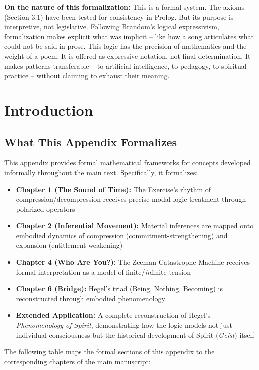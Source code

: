 \documentclass[12pt]{book}
\begin{document}
\textbf{On the nature of this formalization:} This is a formal system. The axioms (Section 3.1) have been tested for consistency in Prolog. But its purpose is interpretive, not legislative. Following Brandom's logical expressivism, formalization makes explicit what was implicit -- like how a song articulates what could not be said in prose. This logic has the precision of mathematics and the weight of a poem. It is offered as expressive notation, not final determination. It makes patterns transferable -- to artificial intelligence, to pedagogy, to spiritual practice -- without claiming to exhaust their meaning.

\section{Introduction}

\subsection{What This Appendix Formalizes}

This appendix provides formal mathematical frameworks for concepts developed informally throughout the main text. Specifically, it formalizes:

\begin{itemize}
\item \textbf{Chapter 1 (The Sound of Time):} The Exercise's rhythm of compression/decompression receives precise modal logic treatment through polarized operators
\item \textbf{Chapter 2 (Inferential Movement):} Material inferences are mapped onto embodied dynamics of compression (commitment-strengthening) and expansion (entitlement-weakening)
\item \textbf{Chapter 4 (Who Are You?):} The Zeeman Catastrophe Machine receives formal interpretation as a model of finite/\textit{in}finite tension
\item \textbf{Chapter 6 (Bridge):} Hegel's triad (Being, Nothing, Becoming) is reconstructed through embodied phenomenology
\item \textbf{Extended Application:} A complete reconstruction of Hegel's \emph{Phenomenology of Spirit}, demonstrating how the logic models not just individual consciousness but the historical development of Spirit (\emph{Geist}) itself
\end{itemize}

The following table maps the formal sections of this appendix to the corresponding chapters of the main manuscript:
\end{document}
